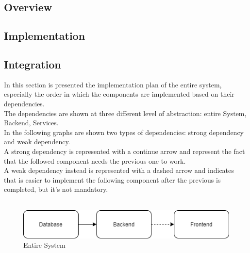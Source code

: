 





\subsection{Overview}

\subsection{Implementation}

\subsection{Integration}
In this section is presented the implementation plan of the entire system, especially the order in which the components are implemented based on their dependencies.\\
The dependencies are shown at three different level of abstraction: entire System, Backend, Services. \\
In the following graphs are shown two types of dependencies: strong dependency and weak dependency.\\
A strong dependency is represented with a continue arrow and represent the fact that the followed component needs the previous one to work.\\
A weak dependency instead is represented with a dashed arrow and indicates that is easier to implement the following component after the previous is completed, but it's not mandatory.\\
\\
\begin{figure}[H]
    \centering
    \includegraphics[height=0.4\textwidth]{Images/IntegrationAndTestingPlan/System.png}
    \caption{Entire System}
    \label{fig:System}
\end{figure}

